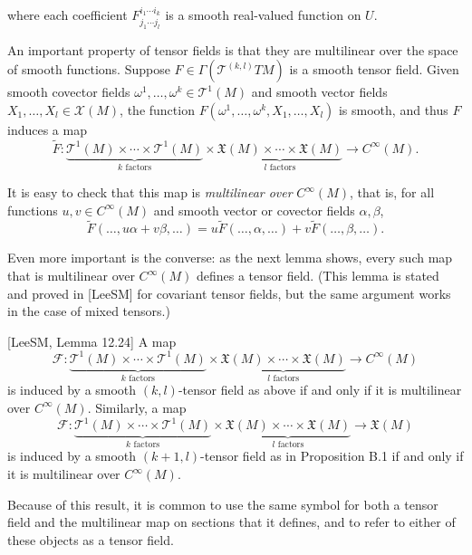 where each coefficient $F^{i_1 \cdots i_k}_{j_1 \cdots j_l}$ is a smooth real-valued function on $U$.

An important property of tensor fields is that they are multilinear over the space of smooth functions. Suppose $F \in \Gamma(\mathcal{T}^{(k,l)} T M)$ is a smooth tensor field. Given smooth covector fields $\omega^1, \ldots, \omega^k \in \mathcal{T}^1(M)$ and smooth vector fields $X_1, \ldots, X_l \in \mathcal{X}(M)$, the function $F(\omega^1, \ldots, \omega^k, X_1, \ldots, X_l)$ is smooth, and thus $F$ induces a map
\[
\tilde{F}: \underbrace{\mathcal{T}^1(M) \times \cdots \times \mathcal{T}^1(M)}_{k \text{ factors}} \times \underbrace{\mathfrak{X}(M) \times \cdots \times \mathfrak{X}(M)}_{l \text{ factors}} \to C^\infty(M).
\]

It is easy to check that this map is \emph{multilinear over} $C^\infty(M)$, that is, for all functions $u, v \in C^\infty(M)$ and smooth vector or covector fields $\alpha, \beta$,
\[
\tilde{F}(\ldots, u\alpha + v\beta, \ldots) = u\tilde{F}(\ldots, \alpha, \ldots) + v\tilde{F}(\ldots, \beta, \ldots).
\]

Even more important is the converse: as the next lemma shows, every such map that is multilinear over $C^\infty(M)$ defines a tensor field. (This lemma is stated and proved in [LeeSM] for covariant tensor fields, but the same argument works in the case of mixed tensors.)

\begin{lemma}
\label{lem:tensor-characterization-lemma}

[LeeSM, Lemma 12.24] A map
\[
\mathcal{F}: \underbrace{\mathcal{T}^1(M) \times \cdots \times \mathcal{T}^1(M)}_{k \text{ factors}} \times \underbrace{\mathfrak{X}(M) \times \cdots \times \mathfrak{X}(M)}_{l \text{ factors}} \to C^\infty(M)
\]
is induced by a smooth $(k,l)$-tensor field as above if and only if it is multilinear over $C^\infty(M)$. Similarly, a map
\[
\mathcal{F}: \underbrace{\mathcal{T}^1(M) \times \cdots \times \mathcal{T}^1(M)}_{k \text{ factors}} \times \underbrace{\mathfrak{X}(M) \times \cdots \times \mathfrak{X}(M)}_{l \text{ factors}} \to \mathfrak{X}(M)
\]
is induced by a smooth $(k+1,l)$-tensor field as in Proposition B.1 if and only if it is multilinear over $C^\infty(M)$.
\end{lemma}

Because of this result, it is common to use the same symbol for both a tensor field and the multilinear map on sections that it defines, and to refer to either of these objects as a tensor field.

